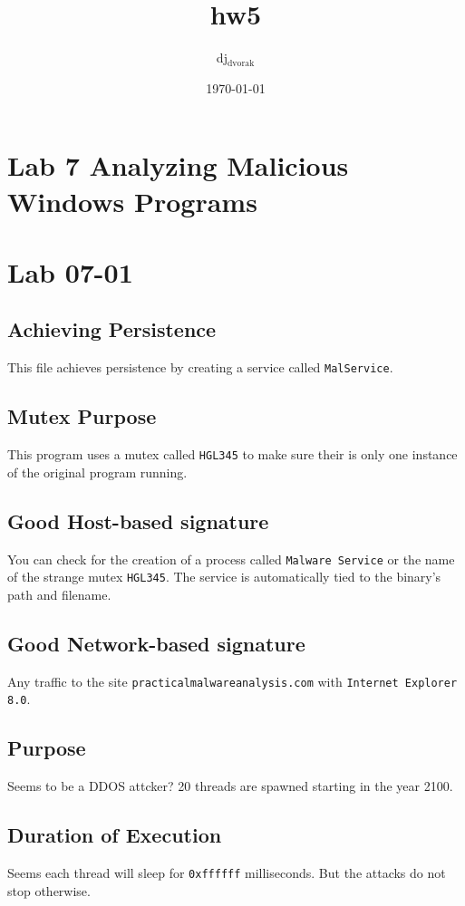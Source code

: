 \documentclass[11pt]{article}
\author{dj$_{\text{dvorak}}$}
\date{\today}
\title{hw5}
\begin{document}
\maketitle
\tableofcontents

\section{Lab 7 Analyzing Malicious Windows Programs}
\label{sec-1}


\section{Lab 07-01}
\label{sec-2}
\subsection{Achieving Persistence}
\label{sec-2-1}
This file achieves persistence by creating a service called \texttt{MalService}. 
\subsection{Mutex Purpose}
\label{sec-2-2}
This program uses a mutex called \texttt{HGL345} to make sure their is only one
instance of the original program running.
\subsection{Good Host-based signature}
\label{sec-2-3}
You can check for the creation of a process called \texttt{Malware Service} or the
name of the strange mutex \texttt{HGL345}. The service is automatically tied to the
binary's path and filename.
\subsection{Good Network-based signature}
\label{sec-2-4}
Any traffic to the site \verb~practicalmalwareanalysis.com~ with \verb~Internet Explorer 8.0~. 
\subsection{Purpose}
\label{sec-2-5}
Seems to be a DDOS attcker? 20 threads are spawned starting in the year 2100. 
\subsection{Duration of Execution}
\label{sec-2-6}
Seems each thread will sleep for \texttt{0xffffff} milliseconds. But the attacks do
not stop otherwise.
\end{document}
